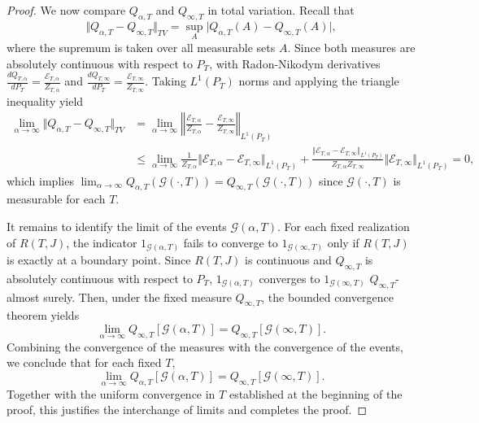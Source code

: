 \documentclass[12pt]{amsart}
\numberwithin{equation}{section}
\newcommand{\1}{\mathbf{1}}
\begin{document}
\begin{proof}
We now compare $Q_{\alpha,T}$ and $Q_{\infty,T}$ in total variation. Recall that
\begin{equation*}
    \Vert Q_{\alpha,T}-Q_{\infty,T}\Vert_{TV} = \sup_{A}\vert Q_{\alpha,T}(A)-Q_{\infty,T}(A)\vert,
\end{equation*}
where the supremum is taken over all measurable sets $A$. Since both measures are absolutely continuous with respect to $P_T$, with Radon-Nikodym derivatives $\frac{d Q_{T,\alpha}}{dP_T} = \frac{\mathcal{E}_{T,\alpha}}{Z_{T,\alpha}}$ and $\frac{dQ_{T,\infty}}{dP_T} = \frac{\mathcal{E}_{T,\infty}}{Z_{T,\infty}}$. Taking $L^1(P_T)$ norms and applying the triangle inequality yield
\begin{equation*}
\begin{split}
    \lim_{\alpha\to\infty}\Vert Q_{\alpha,T}-Q_{\infty,T}\Vert_{TV}& =\lim_{\alpha\to\infty}\left\Vert \frac{\mathcal{E}_{T,\alpha}}{Z_{T,\alpha}}-\frac{\mathcal{E}_{T,\infty}}{Z_{T,\infty}}\right\Vert_{L^1(P_T)}\\
    &\leq \lim_{\alpha\to\infty}\frac{1}{Z_{T,\alpha}}\Vert \mathcal{E}_{T,\alpha}-\mathcal{E}_{T,\infty}\Vert_{L^1(P_T)}+\frac{\Vert \mathcal{E}_{T,\alpha}-\mathcal{E}_{T,\infty}\Vert_{L^1(P_T)}}{Z_{T,\alpha}Z_{T,\infty}}\Vert\mathcal{E}_{T,\infty}\Vert_{L^1(P_T)}=0,
    \end{split}
\end{equation*}
which implies $\lim_{\alpha\to\infty}Q_{\alpha,T}(\mathcal{G}(\cdot,T)) = Q_{\infty,T}(\mathcal{G}(\cdot,T))$ since $\mathcal{G}(\cdot,T)$ is measurable for each $T$.

It remains to identify the limit of the events $\mathcal{G}(\alpha,T)$. For each fixed realization of $R(T,J)$, the indicator $1_{\mathcal{G}(\alpha,T)}$ fails to converge to $1_{\mathcal{G}(\infty,T)}$ only if $R(T,J)$ is exactly at a boundary point. Since $R(T,J)$ is continuous and $Q_{\infty,T}$ is absolutely continuous with respect to $P_T$, $1_{\mathcal{G}(\alpha,T)}$ converges to $1_{\mathcal{G}(\infty,T)}$ $Q_{\infty,T}$-almost surely. Then, under the fixed measure $Q_{\infty,T}$, the bounded convergence theorem yields
\begin{equation*}
    \lim_{\alpha\to\infty}Q_{\infty,T}[\mathcal{G}(\alpha,T)]=Q_{\infty,T}[\mathcal{G}(\infty,T)]. 
\end{equation*}
Combining the convergence of the measures with the convergence of the events, we conclude that for each fixed $T$,
\[
\lim_{\alpha\to\infty}Q_{\alpha,T}[\mathcal{G}(\alpha,T)]
=
Q_{\infty,T}[\mathcal{G}(\infty,T)].
\]
Together with the uniform convergence in $T$ established at the beginning of the proof, this justifies the interchange of limits and completes the proof.
\end{proof}
\end{document}
